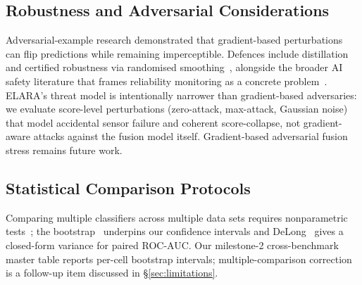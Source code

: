 \documentclass[10pt,conference]{IEEEtran}
\newcommand{\system}{ELARA}
\begin{document}
\subsection{Robustness and Adversarial Considerations}
Adversarial-example research demonstrated that gradient-based
perturbations~\cite{goodfellow2014explaining,madry2017towards,carlini2017evaluating,szegedy2013intriguing,moosavi2016deepfool,biggio2013evasion,chen2017zoo,ilyas2019adversarial}
can flip predictions while remaining imperceptible. Defences include
distillation~\cite{papernot2016distillation} and certified robustness via
randomised smoothing~\cite{cohen2019certified}, alongside the broader AI
safety literature that frames reliability monitoring as a concrete
problem~\cite{amodei2016concrete,varshney2017engineering,moller2024robustness}.
\system{}'s threat model is intentionally narrower than gradient-based
adversaries: we evaluate score-level perturbations (zero-attack, max-attack,
Gaussian noise) that model accidental sensor failure and coherent
score-collapse, not gradient-aware attacks against the fusion model
itself. Gradient-based adversarial fusion stress remains future work.

\subsection{Statistical Comparison Protocols}
Comparing multiple classifiers across multiple data sets requires
nonparametric tests~\cite{demsar2006statistical,benavoli2017time,nadeau2003inference,garcia2010advanced};
the bootstrap~\cite{efron1993bootstrap} underpins our confidence intervals
and DeLong~\cite{delong1988comparing} gives a closed-form variance for
paired ROC-AUC. Our milestone-2 cross-benchmark master table reports
per-cell bootstrap intervals; multiple-comparison correction is a
follow-up item discussed in \S\ref{sec:limitations}.
\end{document}
